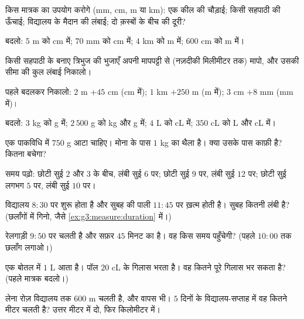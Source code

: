 \begin{exercise}[$\star$]\label{exo:g3:measure:1}
किस मात्रक का उपयोग करोगे (mm, cm, m या km): एक कील की चौड़ाई;
किसी सहपाठी की ऊँचाई; विद्यालय के मैदान की लंबाई; दो क़स्बों के
बीच की दूरी?
\end{exercise}

\begin{exercise}[$\star$]\label{exo:g3:measure:2}
बदलो: $5$ m को cm में; \quad $70$ mm को cm में; \quad $4$ km को m में;
\quad $600$ cm को m में।
\end{exercise}

\begin{exercise}[$\star$]\label{exo:g3:measure:3}
किसी सहपाठी के बनाए त्रिभुज की भुजाएँ अपनी मापपट्टी से (नज़दीकी
मिलीमीटर तक) मापो, और उसकी सीमा की कुल लंबाई
निकालो।
\end{exercise}

\begin{exercise}[$\star$]\label{exo:g3:measure:4}
पहले बदलकर निकालो: $2$ m $+ 45$ cm (cm में); \quad
$1$ km $+ 250$ m (m में); \quad $3$ cm $+ 8$ mm (mm में)।
\end{exercise}

\begin{exercise}[$\star$]\label{exo:g3:measure:5}
बदलो: $3$ kg को g में; \quad $2\,500$ g को kg और g में; \quad
$4$ L को cL में; \quad $350$ cL को L और cL में।
\end{exercise}

\begin{exercise}[$\star$]\label{exo:g3:measure:6}
एक पाकविधि में $750$ g आटा चाहिए। मोना के पास $1$ kg का थैला
है। क्या उसके पास काफ़ी है? कितना बचेगा?
\end{exercise}

\begin{exercise}[$\star$]\label{exo:g3:measure:7}
समय पढ़ो: छोटी सुई $2$ और $3$ के बीच, लंबी सुई $6$ पर; छोटी
सुई $9$ पर, लंबी सुई $12$ पर; छोटी सुई लगभग $5$ पर, लंबी सुई
$10$ पर।
\end{exercise}

\begin{exercise}[$\star$]\label{exo:g3:measure:8}
विद्यालय $8{:}30$ पर शुरू होता है और सुबह की पाली $11{:}45$ पर
ख़त्म होती है। सुबह कितनी लंबी है? (छलाँगों में गिनो, जैसे
\cref{ex:g3:measure:duration} में।)
\end{exercise}

\begin{exercise}[$\star$]\label{exo:g3:measure:9}
रेलगाड़ी $9{:}50$ पर चलती है और सफ़र $45$ मिनट का है। वह किस
समय पहुँचेगी? (पहले $10{:}00$ तक छलाँग लगाओ।)
\end{exercise}

\begin{exercise}[$\star\star$]\label{exo:g3:measure:10}
एक बोतल में $1$ L आता है। पॉल $20$ cL के गिलास भरता है। वह
कितने पूरे गिलास भर सकता है? (पहले मात्रक बदलो।)
\end{exercise}

\begin{exercise}[$\star\star$]\label{exo:g3:measure:11}
लेना रोज़ विद्यालय तक $600$ m चलती है, और वापस भी। $5$ दिनों के
विद्यालय-सप्ताह में वह कितने मीटर चलती है? उत्तर मीटर में दो,
फिर किलोमीटर में।
\end{exercise}
